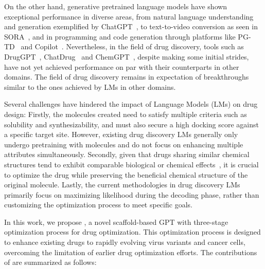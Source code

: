On the other hand, generative pretrained language models have shown exceptional performance in diverse areas, from natural language understanding and generation exemplified by ChatGPT~\citep{wu2023brief, ouyang2022training}, to text-to-video conversion as seen in SORA~\citep{liu2024sora}, and in programming and code generation through platforms like PG-TD~\citep{zhang2023planning} and Copilot~\citep{nguyen2022empirical}. Nevertheless, in the field of drug discovery, tools such as DrugGPT~\citep{li2023druggpt}, ChatDrug~\citep{liu2024conversational} and ChemGPT~\citep{frey2023neural}, despite making some initial strides, have not yet achieved performance on par with their counterparts in other domains. The field of drug discovery remains in expectation of breakthroughs similar to the ones achieved by LMs in other domains.


Several challenges have hindered the impact of Language Models (LMs) on drug design: Firstly, the molecules created need to satisfy multiple criteria such as solubility and synthesizability, and must also secure a high docking score against a specific target site. However, existing drug discovery LMs generally only undergo pretraining with molecules and do not focus on enhancing multiple attributes simultaneously. Secondly, given that drugs sharing similar chemical structures tend to exhibit comparable biological or chemical effects~\citep{bender2004molecular}, it is crucial to optimize the drug while preserving the beneficial chemical structure of the original molecule. Lastly, the current methodologies in drug discovery LMs primarily focus on maximizing likelihood during the decoding phase, rather than customizing the optimization process to meet specific goals.









In this work, we propose \algname, a novel scaffold-based GPT with three-stage optimization process for drug optimization. This optimization process is designed to enhance existing drugs to rapidly evolving virus variants and cancer cells, overcoming the limitation of earlier drug optimization efforts.
The contributions of \algname are summarized as follows:

